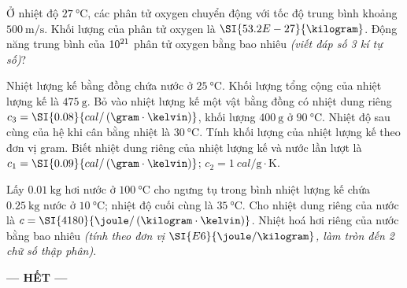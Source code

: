 \begin{ex}
Ở nhiệt độ $\SI{27}{\celsius}$, các phân tử oxygen chuyển động với tốc độ trung bình khoảng $\SI{500}{\meter/\second}$. Khối lượng của phân tử oxygen là $\SI{53.2E-27}{\kilogram}$. Động năng trung bình của $\SI{E21}{}$ phân tử oxygen bằng bao nhiêu \textit{(viết đáp số 3 kí tự số)}?
\end{ex}
\begin{ex}
Nhiệt lượng kế bằng đồng chứa nước ở $\SI{25}{\celsius}$. Khối lượng tổng cộng của nhiệt lượng kế là $\SI{475}{\gram}$. Bỏ vào nhiệt lượng kế một vật bằng đồng có nhiệt dung riêng $c_3=\SI{0.08}{cal/\left(\gram\cdot\kelvin\right)}$, khối lượng $\SI{400}{\gram}$ ở $\SI{90}{\celsius}$. Nhiệt độ sau cùng của hệ khi cân bằng nhiệt là $\SI{30}{\celsius}$. Tính khối lượng của nhiệt lượng kế theo đơn vị gram. Biết nhiệt dung riêng của nhiệt lượng kế và nước lần lượt là $c_1=\SI{0.09}{cal/\left(\gram\cdot\kelvin\right)}$; $c_2=\SI{1}{cal/\gram\cdot\kelvin}$.
\end{ex}
\begin{ex}
	Lấy $\SI{0.01}{\kilogram}$ hơi nước ở $\SI{100}{\celsius}$ cho ngưng tụ trong bình nhiệt lượng kế chứa $\SI{0.25}{\kilogram}$ nước ở $\SI{10}{\celsius}$; nhiệt độ cuối cùng là $\SI{35}{\celsius}$. Cho nhiệt dung riêng của nước là $c=\SI{4180}{\joule/\left(\kilogram\cdot\kelvin\right)}$. Nhiệt hoá hơi riêng của nước bằng bao nhiêu \textit{(tính theo đơn vị $\SI{E6}{\joule/\kilogram}$, làm tròn đến 2 chữ số thập phân)}.
\end{ex}
\begin{center}
	\textbf{--- HẾT ---}
\end{center}